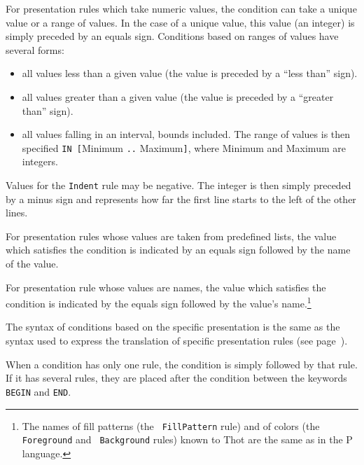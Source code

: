 For presentation rules which take numeric values, the condition can
take a unique value or a range of values.  In the case of a unique
value, this value (an integer) is simply preceded by an equals sign.
Conditions based on ranges of values have several forms:
\begin{itemize}
\item all values less than a given value (the value is preceded by a
``less than'' sign).

\item all values greater than a given value (the value is preceded by a
``greater than'' sign).

\item all values falling in an interval, bounds included.  The range
of values is then specified {\tt IN [}Minimum {\tt ..} Maximum{\tt]},
where Minimum and Maximum are integers.

\end{itemize}
Values for the {\tt Indent} rule may be negative.  The integer is then
simply preceded by a minus sign and represents how far the first line
starts to the left of the other lines.

For presentation rules whose values are taken from predefined lists,
the value which satisfies the condition is indicated by an equals sign
followed by the name of the value.

For presentation rule whose values are names, the value which
satisfies the condition is indicated by the equals sign followed by
the value's name.\footnote{The names of fill patterns (the {\tt
FillPattern} rule) and of colors (the {\tt Foreground} and {\tt
Background} rules) known to Thot are the same as in the P language.}

The syntax of conditions based on the specific presentation is the
same as the syntax used to express the translation of specific
presentation rules (see page~\pageref{prestrans}).

When a condition has only one rule, the condition is simply followed
by that rule.  If it has several rules, they are placed after the
condition between the keywords {\tt BEGIN} and {\tt END}.

